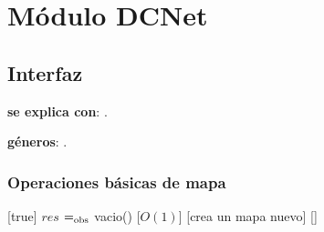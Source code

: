 \section{Módulo DCNet}

\subsection{Interfaz}

\textbf{se explica con}: .

\textbf{géneros}: .

\subsubsection{Operaciones básicas de mapa}

  [true]
  {$res$ $=_{\mathrm{obs}}$ vacio()}
  [$O(1)$]
  [crea un mapa nuevo]
  []
  
  